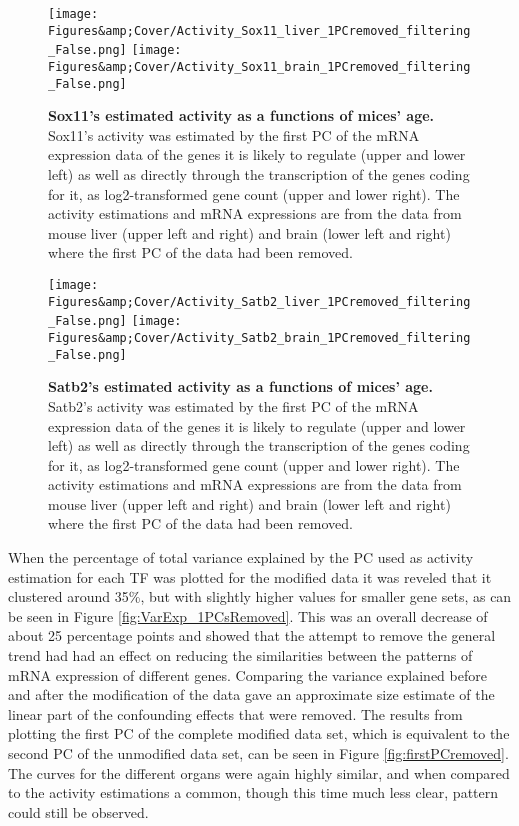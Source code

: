 \begin{figure}
    \centering
    \texttt{[image: Figures\&amp;Cover/Activity\_Sox11\_liver\_1PCremoved\_filtering\_False.png]}
    \texttt{[image: Figures\&amp;Cover/Activity\_Sox11\_brain\_1PCremoved\_filtering\_False.png]}
    \caption{\textbf{Sox11's estimated activity as a functions of mices' age.} Sox11's activity was estimated by the first \ac{PC} of the mRNA expression data of the genes it is likely to regulate (upper and lower left) as well as directly through the transcription of the genes coding for it, as log2-transformed gene count (upper and lower right). The activity estimations and mRNA expressions are from the data from mouse liver (upper left and right) and brain (lower left and right) where the first \ac{PC} of the data had been removed.}
    \label{fig:est_1PCsRemoved_Sox11}
\end{figure}

\begin{figure}
    \centering
    \texttt{[image: Figures\&amp;Cover/Activity\_Satb2\_liver\_1PCremoved\_filtering\_False.png]}
    \texttt{[image: Figures\&amp;Cover/Activity\_Satb2\_brain\_1PCremoved\_filtering\_False.png]}
    \caption{\textbf{Satb2's estimated activity as a functions of mices' age.} Satb2's activity was estimated by the first \ac{PC} of the mRNA expression data of the genes it is likely to regulate (upper and lower left) as well as directly through the transcription of the genes coding for it, as log2-transformed gene count (upper and lower right). The activity estimations and mRNA expressions are from the data from mouse liver (upper left and right) and brain (lower left and right) where the first \ac{PC} of the data had been removed.}
    \label{fig:est_1PCRemoved_Satb2}
\end{figure}

When the percentage of total variance explained by the \ac{PC} used as activity estimation for each \ac{TF} was plotted for the modified data it was reveled that it clustered around 35\%, but with slightly higher values for smaller gene sets, as can be seen in Figure \ref{fig:VarExp_1PCsRemoved}. This was an overall decrease of about 25 percentage points and showed that the attempt to remove the general trend had had an effect on reducing the similarities between the patterns of mRNA expression of different genes. Comparing the variance explained before and after the modification of the data gave an approximate size estimate of the linear part of the confounding effects that were removed. The results from plotting the first \ac{PC} of the complete modified data set, which is equivalent to the second \ac{PC} of the unmodified data set, can be seen in Figure \ref{fig:firstPCremoved}. The curves for the different organs were again highly similar, and when compared to the activity estimations a common, though this time much less clear, pattern could still be observed.

